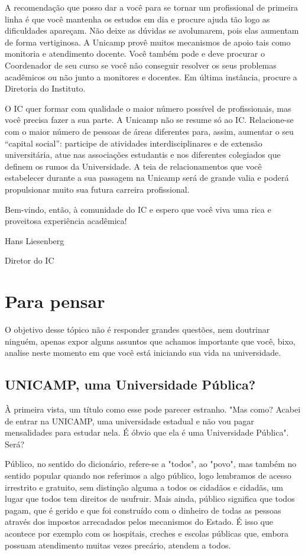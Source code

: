 \documentclass[a4paper,10pt, twocolumn]{article}
\begin{document}
A recomendação que posso dar a você para se tornar um profissional de primeira
linha é que você mantenha os estudos em dia e procure ajuda tão logo as
dificuldades apareçam. Não deixe as dúvidas se avolumarem, pois elas aumentam de
forma vertiginosa. A Unicamp provê muitos mecanismos de apoio tais como
monitoria e atendimento docente. Você também pode e deve procurar o Coordenador
de seu curso se você não conseguir resolver os seus problemas acadêmicos ou não
junto a monitores e docentes. Em última instância, procure a Diretoria do
Instituto.

O IC quer formar com qualidade o maior número possível de profissionais, mas
você precisa fazer a sua parte.  A Unicamp não se resume só ao IC. Relacione-se
com o maior número de pessoas de áreas diferentes para, assim, aumentar o seu
“capital social”: participe de atividades interdisciplinares e de extensão
universitária, atue nas associações estudantis e nos diferentes colegiados que
definem os rumos da Universidade. A teia de relacionamentos que você estabelecer
durante a sua passagem na Unicamp será de grande valia e poderá propulsionar
muito sua futura carreira profissional.

Bem-vindo, então, à comunidade do IC e espero que você viva uma rica
e proveitosa experiência acadêmica!

Hans Liesenberg

Diretor do IC

\section{Para pensar}
O objetivo desse tópico não é responder grandes questões, nem doutrinar ninguém,
apenas expor alguns assuntos que achamos importante que você, bixo, analise
neste momento em que você está iniciando sua vida na universidade.

\subsection{UNICAMP, uma Universidade Pública?} À primeira vista, um título como
esse pode parecer estranho. "Mas como? Acabei de entrar na UNICAMP, uma
universidade estadual e não vou pagar mensalidades para estudar nela. É óbvio
que ela é uma Universidade Pública". Será?

Público, no sentido do dicionário, refere-se a "todos", ao "povo", mas também no
sentido popular quando nos referimos a algo público, logo lembramos de acesso
irrestrito e gratuito, sem distinção alguma a todos os cidadãos e cidadãs, um
lugar que todos tem direitos de usufruir. Mais ainda, público significa que
todos pagam, que é gerido e que foi construído com o dinheiro de todas as
pessoas através dos impostos arrecadados pelos mecanismos do Estado. É isso que
acontece por exemplo com os hospitais, creches e escolas públicas que, embora
possuam atendimento muitas vezes precário, atendem a todos.
\end{document}
